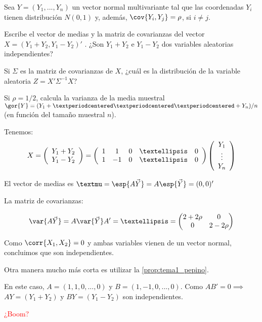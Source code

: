 \begin{problem}[8]
Sea $Y = (Y_1,...,Y_n)$ un vector normal multivariante tal que las coordenadas $Y_i$ tienen distribución
$N(0, 1)$ y, además, $\cov{Y_i , Y_j} = \rho$, si $i≠j$.

\ppart Escribe el vector de medias y la matriz de covarianzas del vector $X = (Y_1+Y_2,Y_1−Y_2)'$ . ¿Son $Y_1+Y_2 $ e $Y_1−Y_2$ dos variables aleatorias independientes?

\ppart Si $Σ$ es la matriz de covarianzas de $X$, ¿cuál es la distribución de la variable aleatoria $Z = X'Σ^{−1}X$?

\ppart Si $ρ = 1/2$, calcula la varianza de la media muestral $\gor{Y}= (Y_1 + · · · + Y_n )/n$ (en función del tamaño muestral $n$).

\solution
{}


\spart 
Tenemos:
\[
	X = \left(\begin{array}{c} Y_1+Y_2\\ Y_1 - Y_2\end{array}\right) =
	\left(\begin{array}{c c c c c}
		1 & 1 & 0 & … & 0\\
		1 & -1 & 0 & … & 0
	\end{array}\right)
	\left(\begin{array}{c}
		Y_1\\
		\vdots\\
		Y_n
	\end{array}\right)
\]

El vector de medias es $µ = \esp{A\vec{Y}} = A\esp{\vec{Y}} = (0,0)'$

La matriz de covarianzas:

\[
\var{A\vec{Y}} = A\var{\vec{Y}}A' = … = \begin{pmatrix}2+2\rho&0\\0&2-2\rho \end{pmatrix}
\]

Como $\corr{X_1,X_2} = 0$ y ambas variables vienen de un vector normal, concluimos que son independientes.


Otra manera mucho más corta es utilizar la \ref{prop:tema1_pepino}.

En este caso, $A = (1,1,0,...,0)$ y $B = (1,-1,0,...,0)$. Como $AB' = 0\implies $ $AY=(Y_1+Y_2)$ y $BY = (Y_1-Y_2)$ son independientes. 

\textcolor{red}{¿Boom?}

\spart 


\end{problem}
